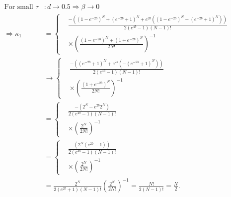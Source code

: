 \documentclass{article}
\begin{document}
\begin{align*}
    \text{For small } \tau & : d \rightarrow 0.5 \Rightarrow \beta \rightarrow 0                                                                                                                                                                                                                                          \\
    \Rightarrow \kappa_1   & = \left\{ \begin{aligned}
                                            & \frac{-\left((1 - e^{-2 b})^N  + (e^{-2 b}  + 1)^N  + e^{2 b}  ((1 - e^{-2 b})^N  - (e^{-2 b}  + 1)^N )\right)}{2 (e^{4 b}  - 1)(N - 1)!} \\
                                            & \times \left(\frac{(1-e^{-2b})^N+(1+e^{-2b})^N}{2N!}\right)^{-1}
                                       \end{aligned} \right. \\
                           & \rightarrow \left\{ \begin{aligned}
                                                      & \frac{-\left((e^{-2 b}  + 1)^N  + e^{2 b}  (- (e^{-2 b}  + 1)^N )\right)}{2 (e^{4 b}  - 1)(N - 1)!} \\
                                                      & \times \left(\frac{(1+e^{-2b})^N}{2N!}\right)^{-1}
                                                 \end{aligned} \right.                                                                         \\
                           & = \left\{ \begin{aligned}
                                            & \frac{-( 2^N- e^{2 b}  2^N)}{2 (e^{4 b}  - 1)(N - 1)!} \\
                                            & \times \left(\frac{2^N}{2N!}\right)^{-1}
                                       \end{aligned} \right.                                                                                                                                                                            \\
                           & = \left\{ \begin{aligned}
                                            & \frac{(2^N (e^{2 b}-1))}{2 (e^{4 b}  - 1)(N - 1)!} \\
                                            & \times \left(\frac{2^N}{2N!}\right)^{-1}
                                       \end{aligned} \right.                                                                                                                                                                                \\
                           & = \frac{2^N}{2 (e^{2b}+1)(N - 1)!} \left(\frac{2^N}{2N!}\right)^{-1} = \frac{N!}{2(N - 1)!}  = \frac{N}{2}.
\end{align*}
\end{document}
